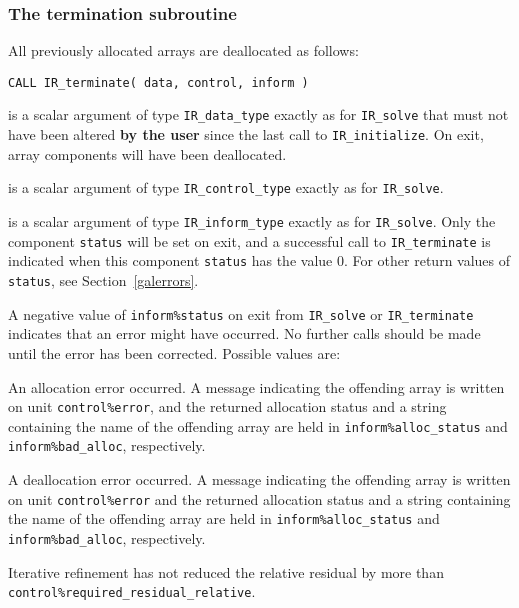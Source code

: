 \documentclass{galahad}
\newcommand{\packagename}{IR}
\begin{document}

\subsubsection{The  termination subroutine}
All previously allocated arrays are deallocated as follows:

\hskip0.5in
{\tt CALL \packagename\_terminate( data, control, inform )}

\begin{description}

 is a scalar \intentinout argument of type
{\tt \packagename\_data\_type}
exactly as for
{\tt \packagename\_solve}
that must not have been altered {\bf by the user} since the last call to
{\tt \packagename\_initialize}.
On exit, array components will have been deallocated.

 is a scalar \intentin argument of type
{\tt \packagename\_control\_type}
exactly as for
{\tt \packagename\_solve}.

 is a scalar \intentout argument of type
{\tt \packagename\_inform\_type}
exactly as for
{\tt \packagename\_solve}.
Only the component {\tt status} will be set on exit, and a
successful call to
{\tt \packagename\_terminate}
is indicated when this  component {\tt status} has the value 0.
For other return values of {\tt status}, see Section~\ref{galerrors}.

\end{description}


\galerrors
A negative value of  {\tt inform\%status} on exit from
{\tt \packagename\_solve}
or
{\tt \packagename\_terminate}
indicates that an error might have occurred. No further calls should be made
until the error has been corrected. Possible values are:

\begin{description}
 An allocation error occurred. A message indicating
the offending
array is written on unit {\tt control\%error}, and the returned allocation
status and a string containing the name of the offending array
are held in {\tt inform\%alloc\_\-status}
and {\tt inform\%bad\_alloc}, respectively.

 A deallocation error occurred.
A message indicating the offending
array is written on unit {\tt control\%error} and the returned allocation
status and a string containing the name of the offending array
are held in {\tt inform\%alloc\_\-status}
and {\tt inform\%bad\_alloc}, respectively.

 Iterative refinement has not reduced the
relative residual by more than
{\tt control\%required\_residual\_relative}.
\end{description}
\end{document}
